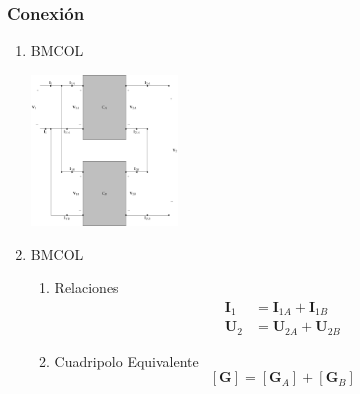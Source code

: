 \subsubsection{Conexión}
\label{sec:org5e14c91}
\begin{enumerate}
\item \hfill{}\textsc{BMCOL}
\label{sec:org43cb61d}

\includegraphics[height=4cm]{../figs/paralelo-serie.pdf}

\item \hfill{}\textsc{BMCOL}
\label{sec:orge5d2f92}
\begin{enumerate}
\item Relaciones
\label{sec:orge6945d2}
\begin{align*}
  \mathbf{I}_1 &= \mathbf{I}_{1A} + \mathbf{I}_{1B}\\
  \mathbf{U}_2 &= \mathbf{U}_{2A} + \mathbf{U}_{2B}
\end{align*}

\item Cuadripolo Equivalente
\label{sec:orgd5cfc0b}
\[
  \boxed{[\mathbf{G}] = [\mathbf{G}_A] + [\mathbf{G}_B]}
\]
\end{enumerate}
\end{enumerate}

